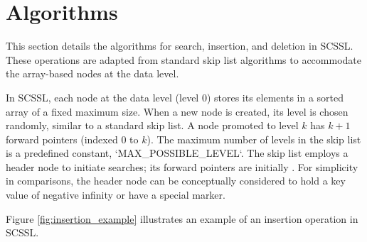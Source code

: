 \documentclass{article}
\begin{document}
\section{Algorithms}
\label{sec:algorithms}
This section details the algorithms for search, insertion, and deletion in SCSSL. These operations are adapted from standard skip list algorithms to accommodate the array-based nodes at the data level.

In SCSSL, each node at the data level (level 0) stores its elements in a sorted array of a fixed maximum size. When a new node is created, its level is chosen randomly, similar to a standard skip list. A node promoted to level $k$ has $k+1$ forward pointers (indexed 0 to $k$). The maximum number of levels in the skip list is a predefined constant, `MAX_POSSIBLE_LEVEL`. The skip list employs a header node to initiate searches; its forward pointers are initially \Nil. For simplicity in comparisons, the header node can be conceptually considered to hold a key value of negative infinity or have a special marker.

Figure \ref{fig:insertion_example} illustrates an example of an insertion operation in SCSSL.
\end{document}
